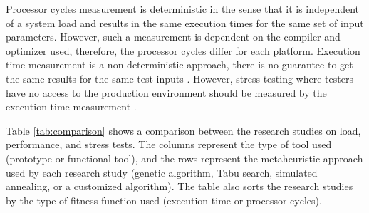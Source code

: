 \documentclass{bmcart}
\begin{document}
Processor cycles measurement is deterministic in the sense that it is independent of a system load and results in the same execution times for the same set of input parameters. However, such a measurement is dependent on the compiler and optimizer used, therefore, the processor cycles differ for each platform. Execution time measurement is a non deterministic approach, there is no guarantee to get the same results for the same test inputs \citep{Afzal2009a}.  However, stress testing where testers have no access to the production environment should be measured by the execution time measurement \citep{Molyneaux2009} \citep{Afzal2009a}.

Table \ref{tab:comparison}  shows a comparison between the research studies on load, performance, and stress tests. The columns represent the type of tool used (prototype or functional tool), and the rows represent the metaheuristic approach used by each research study (genetic algorithm, Tabu search, simulated annealing, or a customized algorithm). The table also sorts the research studies by the type of fitness function used (execution time or processor cycles). 
\end{document}
